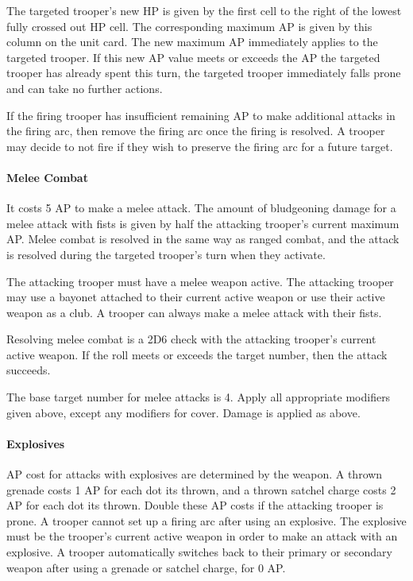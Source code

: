 The targeted trooper's new HP is given by the first cell to the right of the lowest fully crossed out HP cell.
The corresponding maximum AP is given by this column on the unit card.
The new maximum AP immediately applies to the targeted trooper.
If this new AP value meets or exceeds the AP the targeted trooper has already spent this turn, the targeted trooper immediately falls prone and can take no further actions.

If the firing trooper has insufficient remaining AP to make additional attacks in the firing arc, then remove the firing arc once the firing is resolved.
A trooper may decide to not fire if they wish to preserve the firing arc for a future target.

\paragraph*{Melee Combat}

It costs 5 AP to make a melee attack.
The amount of bludgeoning damage for a melee attack with fists is given by half the attacking trooper's current maximum AP.
Melee combat is resolved in the same way as ranged combat, and the attack is resolved during the targeted trooper's turn when they activate.

The attacking trooper must have a melee weapon active.
The attacking trooper may use a bayonet attached to their current active weapon or use their active weapon as a club.
A trooper can always make a melee attack with their fists.

Resolving melee combat is a 2D6 check with the attacking trooper's current active weapon.
If the roll meets or exceeds the target number, then the attack succeeds.

The base target number for melee attacks is 4.
Apply all appropriate modifiers given above, except any modifiers for cover.
Damage is applied as above.

\paragraph*{Explosives}

AP cost for attacks with explosives are determined by the weapon.
A thrown grenade costs 1 AP for each dot its thrown, and a thrown satchel charge costs 2 AP for each dot its thrown.
Double these AP costs if the attacking trooper is prone.
A trooper cannot set up a firing arc after using an explosive.
The explosive must be the trooper's current active weapon in order to make an attack with an explosive.
A trooper automatically switches back to their primary or secondary weapon after using a grenade or satchel charge, for 0 AP.

